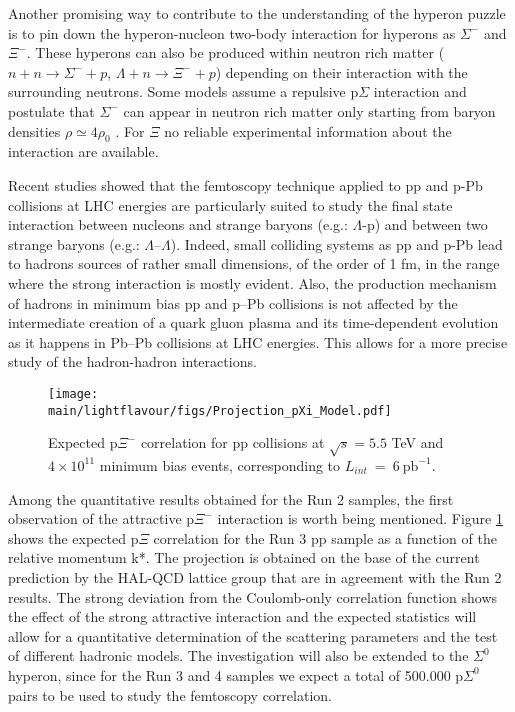 Another promising way to contribute to the understanding of the hyperon puzzle is to pin down the hyperon-nucleon two-body interaction
for  hyperons as $\Sigma^{-}$ and $\Xi^-$. These hyperons can also be produced within neutron rich matter 
($n+n \rightarrow \Sigma^- + p$, $\Lambda +n \rightarrow \Xi^- +  p$) depending on their interaction with the surrounding neutrons.
Some models assume a repulsive p$\Sigma$ interaction and postulate that $\Sigma^{-}$ can appear in neutron rich matter only starting from baryon densities $\rho \simeq 4\rho_{0}$ \cite{PRC-93-035808-2016}.
For $\Xi$ no reliable experimental information about the interaction are available.

Recent studies \cite{Acharya:2018gyz} showed that the femtoscopy technique applied to  pp and p-Pb collisions at LHC energies are particularly suited to study the final state interaction between nucleons and strange baryons (e.g.: $\Lambda$\--p) and between two strange baryons (e.g.: $\Lambda$--$\Lambda$). 
Indeed, small colliding systems as pp and p-Pb lead to hadrons sources of rather small dimensions, of the order of 1 fm, in the range where the strong interaction is mostly evident.
Also, the production mechanism of hadrons in minimum bias pp and p--Pb collisions is not affected by the intermediate creation of a quark gluon plasma and its time-dependent evolution as it happens in Pb--Pb collisions at LHC energies. This allows for a more precise study of the hadron-hadron interactions.

\begin{figure}
\centering
\texttt{[image: \\main/lightflavour/figs/Projection\_pXi\_Model.pdf]}
\caption{Expected p$\Xi^-$ correlation for pp collisions at $\sqrt{s} = 5.5$ TeV and $4\times 10^{11}$ minimum bias events, corresponding to $L_{int}~=~6~\mathrm{pb}^{-1}$.}
\label{pXiProj}
\end{figure}

Among the quantitative results obtained for the Run 2 samples, the first observation of the attractive p$\Xi^-$ interaction is worth being mentioned. 
Figure \ref{pXiProj} shows the expected p$\Xi$ correlation for the Run 3 pp sample as a function of the relative momentum k*. 
The projection is obtained on the base of the current prediction by the HAL-QCD lattice group that are in agreement with the Run 2 results.
The strong deviation from the Coulomb-only correlation function shows the effect of the strong attractive interaction 
and the expected statistics will allow for a quantitative determination of the scattering parameters and the test of different hadronic models.
The investigation will also be extended to the $\Sigma^0$ hyperon, since for the Run 3 and 4 samples we expect a total of 500.000 p$\Sigma^0$ pairs
to be used to study the femtoscopy correlation.

